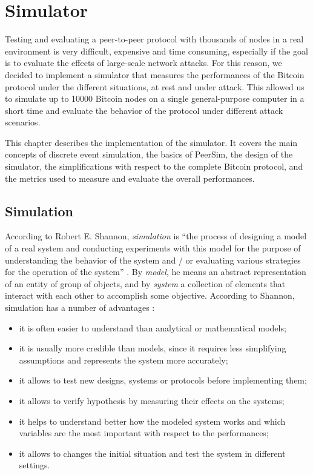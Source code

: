 \chapter{Simulator}
\label{chapter:simulator}

Testing and evaluating a peer-to-peer protocol with thousands of nodes in a real environment is very difficult, expensive and time consuming, especially if the goal is to evaluate the effects of large-scale network attacks.
For this reason, we decided to implement a simulator that measures the performances of the Bitcoin protocol under the different situations, at rest and under attack.
This allowed us to simulate up to \num{10000} Bitcoin nodes on a single general-purpose computer in a short time and evaluate the behavior of the protocol under different attack scenarios.

\medskip
This chapter describes the implementation of the simulator.
It covers the main concepts of discrete event simulation, the basics of PeerSim, the design of the simulator, the simplifications with respect to the complete Bitcoin protocol, and the metrics used to measure and evaluate the overall performances.


\section{Simulation}
According to Robert E. Shannon, \textit{simulation} is ``the process of designing a model of a real system and conducting experiments with this model for the purpose of understanding the behavior of the system and / or evaluating various strategies for the operation of the system'' \cite{simulation_shannon_1998}.
By \textit{model}, he means an abstract representation of an entity of group of objects, and by \textit{system} a collection of elements that interact with each other to accomplish some objective.
According to Shannon, simulation has a number of advantages \cite{simulation_shannon_1998}:
\begin{itemize}
	\item it is often easier to understand than analytical or mathematical models;
	\item it is usually more credible than models, since it requires less simplifying assumptions and represents the system more accurately;
	\item it allows to test new designs, systems or protocols before implementing them;
	\item it allows to verify hypothesis by measuring their effects on the systems;
	\item it helps to understand better how the modeled system works and which variables are the most important with respect to the performances;
	\item it allows to changes the initial situation and test the system in different settings.
\end{itemize}

